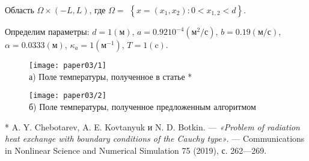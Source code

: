 \begin{frame}
    Область $\Omega \times(-L, L)$,
    где $\Omega=$ $\left\{x=\left(x_{1}, x_{2}\right): 0<x_{1,2}<d\right\}$.


    Определим параметры:
    $d=1(\text{м})$, $a=0.9210^{-4}(\text{м}^{2} / \text{с})$,
    $b=0.19(\text{м} / \text{с})$, $\alpha=0.0333(\text{м})$,
    $\kappa_{a}=1\left(\text{м}^{-1}\right)$, $T = 1(\text{c})$.
    \begin{figure}[h!t]
        \begin{minipage}[b][][b]{0.49\linewidth}
            \centering
            \texttt{[image: paper03/1]} \\ а) Поле температуры,
            полученное в статье *
        \end{minipage}
        \hfill
        \begin{minipage}[b][][b]{0.49\linewidth}
            \centering
            \texttt{[image: paper03/2]} \\
            б) Поле температуры, полученное предложенным алгоритмом
        \end{minipage}
        \label{fig:4_3:1}
    \end{figure}
    \tiny{* A. Y. Chebotarev, A. E. Kovtanyuk и N. D. Botkin. — \textit{«Problem of
    radiation heat exchange with boundary conditions of the Cauchy type»}. —
    Communications in Nonlinear Science and Numerical Simulation 75 (2019),
        с. 262—269.}
\end{frame}

